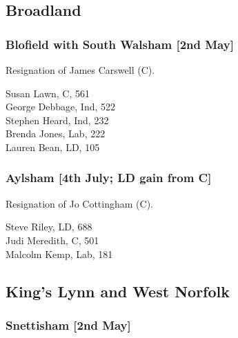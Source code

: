 \documentclass[a4paper,openany,10pt]{book}
\begin{document}
\subsection*{Broadland}

\subsubsection*{Blofield with South Walsham \hspace*{\fill}\nolinebreak[1]%
\enspace\hspace*{\fill}
[2nd May]}


Resignation of James Carswell (C).



Susan Lawn, C, 561\\
George Debbage, Ind, 522\\
Stephen Heard, Ind, 232\\
Brenda Jones, Lab, 222\\
Lauren Bean, LD, 105\\


\subsubsection*{Aylsham \hspace*{\fill}\nolinebreak[1]%
\enspace\hspace*{\fill}
[4th July; LD gain from C]}


Resignation of Jo Cottingham (C).



Steve Riley, LD, 688\\
Judi Meredith, C, 501\\
Malcolm Kemp, Lab, 181\\


\subsection*{King's Lynn and West Norfolk}

\subsubsection*{Snettisham \hspace*{\fill}\nolinebreak[1]%
\enspace\hspace*{\fill}
[2nd May]}
\end{document}
